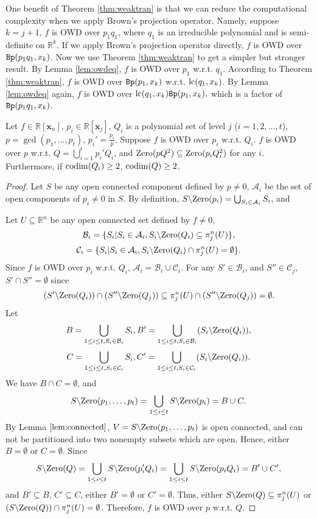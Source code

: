 \documentclass[amsthm]{elsart}
\def \codim {{\rm codim}}
\def \lc  {{\rm lc}}
\def \Bproj  {{\tt Bp}}
\def  \zero {{\rm Zero}}
\def \RR {{\mathbb R}}
\newcommand{\xx}{\bm{x}}
\begin{document}
One benefit of Theorem \ref{thm:weaktran} is that we can reduce the computational complexity when we apply Brown's projection operator. Namely, suppose $k=j+1$, $f$ is OWD over $p_1q_1$, where $q_1$ is an irreducible polynomial and is semi-definite on $\RR^k$. If we apply Brown's projection operator directly, $f$ is OWD over $\Bproj(p_1q_1,x_k)$. Now we use Theorem \ref{thm:weaktran} to get a simpler but stronger result. By Lemma \ref{lem:owdeq}, $f$ is OWD over $p_1$ w.r.t. $q_1$. According to Theorem \ref{thm:weaktran}, $f$ is OWD over $\Bproj(p_1,x_k)$ w.r.t. $\lc(q_1,x_{k})$. By Lemma \ref{lem:owdeq} again, $f$ is OWD over $\lc(q_1,x_{k})\Bproj(p_1,x_k),$ which is a factor of $\Bproj(p_1q_1,x_k)$.

\begin{thm}\label{thm:weakgcd}
   Let $f\in\RR[\xx_n]$, $p_i\in\RR[\xx_j]$, $Q_i$ is a polynomial set of level $j$ ($i=1,2,\ldots,t$), $p=\gcd(p_1,\ldots,p_t)$, $p_i'=\frac{p_i}{p}$. Suppose $f$ is OWD over $p_i$ w.r.t. $Q_i$. $f$ is OWD over $p$ w.r.t. $Q=\bigcup_{i=1}^tp_i'Q_i$, and $\zero(pQ^2)\subseteq\zero(p_iQ_i^2)$ for any $i$. Furthermore, if $\codim(Q_i)\ge2$, $\codim(Q)\ge2$.
\end{thm}\begin{proof}
Let $S$ be any open connected component defined by $p\neq0$, $\mathcal{A}_i$ be the set of open components of $p_i\neq0$ in $S$. By definition, $S\backslash{\zero(p_i)}=\bigcup_{S_{i}\in\mathcal{A}_i} S_{i}$, and

Let $U\subseteq\RR^n$ be any open connected set defined by $f\neq0$, $$\mathcal{B}_i=\{S_{i}|S_{i}\in\mathcal{A}_i, S_{i}\backslash{\zero(Q_i)}\subseteq \pi_{j}^n(U)\},$$
$$\mathcal{C}_i=\{S_{i}|S_{i}\in\mathcal{A}_i, S_{i}\backslash{\zero(Q_i)}\cap \pi_{j}^n(U)=\emptyset\}.$$
Since $f$ is OWD over $p_i$ w.r.t. $Q_i$, $\mathcal{A}_i=\mathcal{B}_i\cup \mathcal{C}_i$.
For any $S'\in \mathcal{B}_i$, and $S''\in \mathcal{C}_j$, $S'\cap S''=\emptyset$ since $$(S'\backslash{\zero(Q_i)})\cap (S''\backslash{\zero(Q_j)})\subseteq \pi_{j}^n(U)\cap (S''\backslash{\zero(Q_j)})=\emptyset.$$
Let $$B=\bigcup_{1\le i\le t,S_{i}\in\mathcal{B}_i} S_{i}, B'=\bigcup_{1\le i\le t,S_{i}\in\mathcal{B}_i} (S_{i}\backslash{\zero(Q_i)}),$$
$$C=\bigcup_{1\le i\le t,S_{i}\in\mathcal{C}_i} S_{i}, C'=\bigcup_{1\le i\le t,S_{i}\in\mathcal{C}_i} (S_{i}\backslash{\zero(Q_i)}).$$
We have $B\cap C=\emptyset$, and
$$S\backslash{\zero(p_1,\ldots,p_t)}=\bigcup_{1\le i\le t} S\backslash{\zero(p_i)}=B\cup C.$$
By Lemma $\ref{lem:connected}$, $V=S\backslash{\zero(p_1,\ldots,p_t)}$ is open connected, and can not be
partitioned into two nonempty subsets which are open. Hence, either $B=\emptyset$ or $C=\emptyset$.
Since $$S\backslash{\zero(Q)}=\bigcup_{1\le i\le t} S\backslash{\zero(p_i'Q_i)}=\bigcup_{1\le i\le t} S\backslash{\zero(p_iQ_i)}=B'\cup C',$$
and $B'\subseteq B$, $C'\subseteq C$, either $B'=\emptyset$ or $C'=\emptyset$. Thus, either $S\backslash{\zero(Q)}\subseteq \pi_{j}^n(U)$ or $(S\backslash{\zero(Q)})\cap \pi_{j}^n(U)=\emptyset$. Therefore, $f$ is OWD over $p$ w.r.t. $Q$.


\end{proof}
\end{document}
